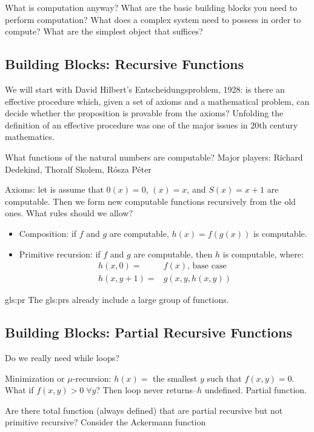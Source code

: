 \documentclass[]{article}
\begin{document}
What is computation anyway? What are the basic building blocks you need to perform computation? What does a complex system need to possess in order to compute? What are the simplest object that suffices?
\subsection{Building Blocks: Recursive Functions}
We will start with David Hilbert's Entscheidungsproblem, 1928: is there an effective procedure which, given a set of axioms and a mathematical problem, can decide whether the proposition is provable from the axioms? Unfolding the definition of an  effective procedure was one of the major issues in 20th century mathematics.

What functions of the natural numbers are computable? Major players: Richard Dedekind, Thoralf Skolem, R\'osza P\'eter

Axioms: let is assume that $0(x)=0$, $(x)=x$, and $S(x)=x+1$ are computable. Then we form new computable functions recursively from the old ones. What rules should we allow?

\begin{itemize}
	\item Composition: if $f$ and $g$ are computable, $h(x) = f(g(x))$ is computable.
	\item Primitive recursion: if $f$ and $g$ are computable, then $h$ is computable, where:
	\begin{align*}
			h(x,0) =& f(x) \text{, base case}\\
			h(x,y+1) =& g(x,y,h(x,y))
	\end{align*}
\end{itemize}

\glsdesc{gls:pr} The \glspl{gls:pr} already include a large group of functions.

\subsection{Building Blocks: Partial Recursive Functions}

Do we really need while loops?

Minimization or $\mu$-recursion: $h(x)=$ the smallest $y$ such that $f(x,y)=0$. What if $f(x,y)>0 \; \forall y$? Then loop never returns--$h$ undefined. Partial function.

Are there total function (always defined) that are partial recursive but not primitive recursive? Consider the Ackermann function
\end{document}
